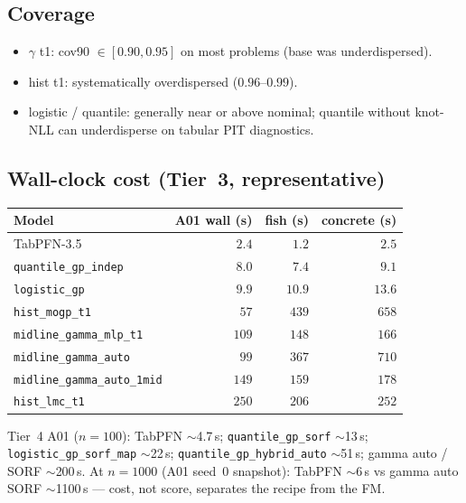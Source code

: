 \documentclass[11pt,a4paper]{article}
\theoremstyle{definition}
\begin{document}
\subsection{Coverage}
\begin{itemize}[leftmargin=1.4em,itemsep=0.15em]
  \item $\gamma$ t1: cov90 $\in[0.90,0.95]$ on most problems (base was underdispersed).
  \item hist t1: systematically overdispersed ($0.96$--$0.99$).
  \item logistic / quantile: generally near or above nominal; quantile without
        knot-NLL can underdisperse on tabular PIT diagnostics.
\end{itemize}

\subsection{Wall-clock cost (Tier~3, representative)}
\begin{center}
\renewcommand{\arraystretch}{1.05}
\small
\begin{tabular}{@{}lrrr@{}}
\toprule
Model & A01 wall (s) & fish (s) & concrete (s) \\
\midrule
TabPFN-3.5 & $2.4$ & $1.2$ & $2.5$ \\
\texttt{quantile\_gp\_indep} & $8.0$ & $7.4$ & $9.1$ \\
\texttt{logistic\_gp} & $9.9$ & $10.9$ & $13.6$ \\
\texttt{hist\_mogp\_t1} & $57$ & $439$ & $658$ \\
\texttt{midline\_gamma\_mlp\_t1} & $109$ & $148$ & $166$ \\
\texttt{midline\_gamma\_auto} & $99$ & $367$ & $710$ \\
\texttt{midline\_gamma\_auto\_1mid} & $149$ & $159$ & $178$ \\
\texttt{hist\_lmc\_t1} & $250$ & $206$ & $252$ \\
\bottomrule
\end{tabular}
\end{center}

Tier~4 A01 ($n{=}100$): TabPFN $\sim$4.7\,s;
\texttt{quantile\_gp\_sorf} $\sim$13\,s;
\texttt{logistic\_gp\_sorf\_map} $\sim$22\,s;
\texttt{quantile\_gp\_hybrid\_auto} $\sim$51\,s;
gamma auto / SORF $\sim$200\,s.
At $n{=}1000$ (A01 seed~0 snapshot): TabPFN $\sim$6\,s vs gamma auto SORF
$\sim$1100\,s --- cost, not score, separates the recipe from the FM.
\end{document}
